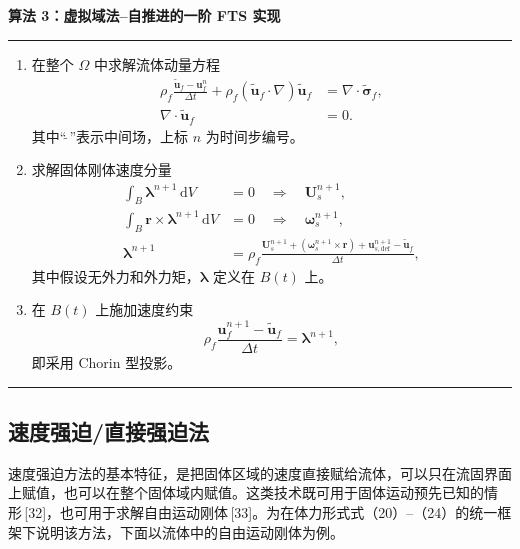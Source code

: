\documentclass[UTF8,11pt,a4paper]{ctexart}
\newcommand{\dd}{\,\mathrm{d}}
\newenvironment{algbox}[1]{%
  \par\medskip\noindent\textbf{#1}\par\smallskip\hrule\smallskip
  \begin{enumerate}[leftmargin=2.2em,label=\arabic*.]\small
}{%
  \end{enumerate}\smallskip\hrule\par\medskip
}
\begin{document}
\begin{algbox}{算法 3：虚拟域法--自推进的一阶 FTS 实现}
\item 在整个 $\Omega$ 中求解流体动量方程
\begin{align*}
\rho_f\frac{\tilde{\bm u}_f-\bm u_f^n}{\Delta t}
+\rho_f(\tilde{\bm u}_f\cdot\nabla)\tilde{\bm u}_f
&=\nabla\cdot\tilde{\bm\sigma}_f,\\
\nabla\cdot\tilde{\bm u}_f&=0.
\end{align*}
其中“$\tilde{\ }$”表示中间场，上标 $n$ 为时间步编号。
\item 求解固体刚体速度分量
\begin{align*}
\int_B\bm\lambda^{n+1}\dd V&=0\quad\Longrightarrow\quad \bm U_s^{n+1},\\
\int_B\bm r\times\bm\lambda^{n+1}\dd V&=0\quad\Longrightarrow\quad \bm\omega_s^{n+1},\\
\bm\lambda^{n+1}&=\rho_f\frac{\bm U_s^{n+1}+(\bm\omega_s^{n+1}\times\bm r)+\bm u_{s,\mathrm{def}}^{n+1}-\tilde{\bm u}_f}{\Delta t},
\end{align*}
其中假设无外力和外力矩，$\bm\lambda$ 定义在 $B(t)$ 上。
\item 在 $B(t)$ 上施加速度约束
\[
\rho_f\frac{\bm u_f^{n+1}-\tilde{\bm u}_f}{\Delta t}=\bm\lambda^{n+1},
\]
即采用 Chorin 型投影。
\end{algbox}

\subsection{速度强迫/直接强迫法}

速度强迫方法的基本特征，是把固体区域的速度直接赋给流体，可以只在流固界面上赋值，也可以在整个固体域内赋值。这类技术既可用于固体运动预先已知的情形\,[32]，也可用于求解自由运动刚体\,[33]。为在体力形式式（20）--（24）的统一框架下说明该方法，下面以流体中的自由运动刚体为例。
\end{document}

